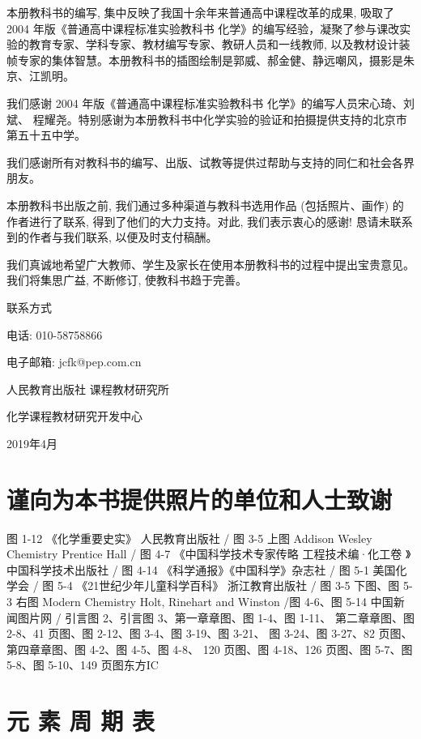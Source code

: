\documentclass[10pt]{article}
\begin{document}
本册教科书的编写, 集中反映了我国十余年来普通高中课程改革的成果, 吸取了 2004 年版《普通高中课程标准实验教科书 化学》的编写经验，凝聚了参与课改实验的教育专家、学科专家、教材编写专家、教研人员和一线教师, 以及教材设计装帧专家的集体智慧。本册教科书的插图绘制是郭威、郝金健、静远嘲风，摄影是朱京、江凯明。

我们感谢 2004 年版《普通高中课程标准实验教科书 化学》的编写人员宋心琦、刘斌、 程耀尧。特别感谢为本册教科书中化学实验的验证和拍摄提供支持的北京市第五十五中学。

我们感谢所有对教科书的编写、出版、试教等提供过帮助与支持的同仁和社会各界朋友。

本册教科书出版之前, 我们通过多种渠道与教科书选用作品 (包括照片、画作) 的作者进行了联系, 得到了他们的大力支持。对此, 我们表示衷心的感谢! 恳请未联系到的作者与我们联系, 以便及时支付稿酬。

我们真诚地希望广大教师、学生及家长在使用本册教科书的过程中提出宝贵意见。我们将集思广益, 不断修订, 使教科书趋于完善。

联系方式

电话: 010-58758866

电子邮箱: jcfk@pep.com.cn

人民教育出版社 课程教材研究所

化学课程教材研究开发中心

2019年4月

\section*{谨向为本书提供照片的单位和人士致谢}

图 1-12 《化学重要史实》 人民教育出版社 / 图 3-5 上图 Addison Wesley Chemistry Prentice Hall / 图 4-7 《中国科学技术专家传略 工程技术编·化工卷 》中国科学技术出版社 / 图 4-14 《科学通报》《中国科学》杂志社 / 图 5-1 美国化学会 / 图 5-4 《21世纪少年儿童科学百科》 浙江教育出版社 / 图 3-5 下图、图 5-3 右图 Modern Chemistry Holt, Rinehart and Winston /图 4-6、图 5-14 中国新闻图片网 / 引言图 2、引言图 3、第一章章图、图 1-4、图 1-11、 第二章章图、图 2-8、41 页图、图 2-12、图 3-4、图 3-19、图 3-21、 图 3-24、图 3-27、82 页图、第四章章图、图 4-2、图 4-5、图 4-8、 120 页图、图 4-18、126 页图、图 5-7、图 5-8、图 5-10、149 页图东方IC

\section*{元 素 周 期 表}
\end{document}
